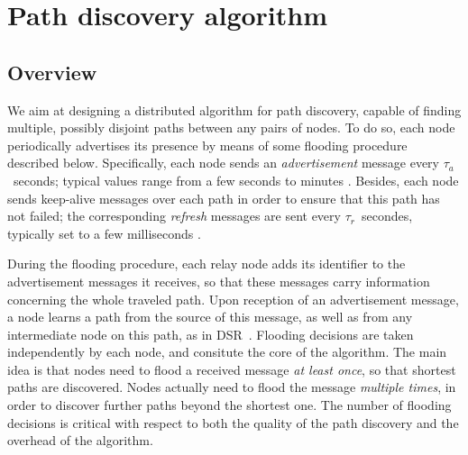 \documentclass[conference]{IEEEtran}
\newcommand{\tadvertise}{\ensuremath{\tau_{a}}} \newcommand{\trefresh}{\ensuremath{\tau_{r}}} \newcommand{\tm}{\tadvertise} \newcommand{\tr}{\trefresh}
\begin{document}
\begin{comment}
Regarding forwarding techniques, the work in \cite{Chen98Infocom} proposes simple solutions for suffix matched path sets. The BANANAS framework in \cite{Kaur03Sigcomm} develops forwarding solutions very similar to source routing, trying to minimize the overhead suffered by carrying the whole path within the packet. In DSR, classical source routing is employed, while the modern multipath infrastructures employ a variant of source routing called explicit routing, usually adopted together with MPLS protocols. 
\end{comment}



\section{Path discovery algorithm}\label{sec:Definitions}

\subsection{Overview}

We aim at designing  a distributed algorithm for path discovery, capable of finding multiple, possibly disjoint paths between any pairs of nodes. To do so, each node  periodically advertises its presence  by means of some flooding procedure described below. Specifically, each node sends  an \emph{advertisement} message  every \tadvertise\ seconds; typical values range from a few seconds to minutes \cite{Srihari01Iwqos}. Besides,  each node sends keep-alive messages over each path in order to ensure that this path has not failed; the corresponding \emph{refresh} messages are sent every  \trefresh\ secondes, typically set to a few milliseconds \cite{Fouli09Ieeecm}. 




During the flooding procedure, each relay node adds its identifier to the advertisement messages it receives, so that these messages carry information concerning the whole traveled  path. Upon reception of an advertisement message, a node learns a path from the source of this message, as well as from any intermediate node on this path, as in DSR~\cite{Johnson07Rfc4728}.
Flooding decisions are taken independently by each node, and consitute the core of the algorithm. The main idea is that nodes need to flood a received message \emph{at least once}, so that shortest paths are discovered. Nodes actually need to flood the message \emph{multiple times}, in order to discover further paths beyond the shortest one. The number of flooding decisions   is critical with respect to both the quality of the path discovery and the overhead of the algorithm.
\end{document}

